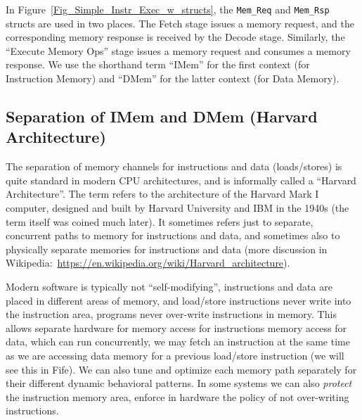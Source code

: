 
In Figure~\ref{Fig_Simple_Instr_Exec_w_structs}, the \verb|Mem_Req|
and \verb|Mem_Rsp| structs are used in two places.  The Fetch stage
issues a memory request, and the corresponding memory response is
received by the Decode stage.  Similarly, the ``Execute Memory Ops''
stage issues a memory request and consumes a memory response.  We use
the shorthand term ``IMem'' for the first context (for Instruction
Memory) and ``DMem'' for the latter context (for Data Memory).


\subsection{Separation of IMem and DMem (Harvard Architecture)}

\label{Sec_Harvard_architecture}


The separation of memory channels for instructions and data
(loads/stores) is quite standard in modern CPU architectures, and is
informally called a ``Harvard Architecture''.  The term refers to the
architecture of the Harvard Mark I computer, designed and built by
Harvard University and IBM in the 1940s (the term itself was coined
much later).  It sometimes refers just to separate, concurrent paths
to memory for instructions and data, and sometimes also to physically
separate memories for instructions and data (more discussion in
Wikipedia:~\url{https://en.wikipedia.org/wiki/Harvard_architecture}).

Modern software is typically not ``self-modifying'', {\ie}
instructions and data are placed in different areas of memory, and
load/store instructions never write into the instruction area, {\ie}
programs never over-write instructions in memory.  This allows
separate hardware for memory access for instructions {\vs} memory
access for data, which can run concurrently, {\ie} we may fetch an
instruction at the same time as we are accessing data memory for a
previous load/store instruction (we will see this in Fife).  We can
also tune and optimize each memory path separately for their different
dynamic behavioral patterns.  In some systems we can also
\emph{protect} the instruction memory area, {\ie} enforce in hardware
the policy of not over-writing instructions.

